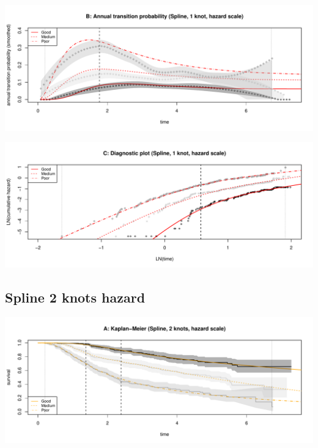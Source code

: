 \documentclass[
]{article}
\begin{document}
\begin{flushleft}\includegraphics[height=0.25\textheight]{Images/spline_hazard1-2} \end{flushleft}

\begin{flushleft}\includegraphics[height=0.25\textheight]{Images/spline_hazard1-3} \end{flushleft}

\clearpage

\hypertarget{spline-2-knots-hazard}{%
\subsection{Spline 2 knots hazard}\label{spline-2-knots-hazard}}

\begin{flushleft}\includegraphics[height=0.25\textheight]{Images/spline_hazard2-1} \end{flushleft}
\end{document}
